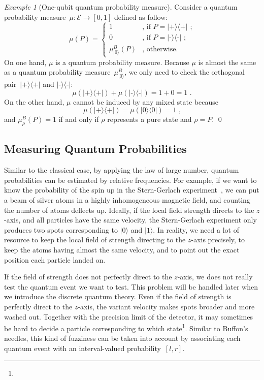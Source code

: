 \documentclass{article}
\theoremstyle{remark}
\newtheorem{example}{Example}
\newcommand{\events}{\ensuremath{\mathcal{E}}}
\newcommand{\ket}[1]{|#1\rangle}
\newcommand{\proj}[1]{|#1 \rangle\langle #1 |}
\newcommand{\ps}{\texttt{+}}
\newcommand{\ms}{\texttt{-}}
\newcommand{\yutsung}[1]{\fbox{\begin{minipage}{0.9\textwidth}\color{purple}{Yu-Tsung says: #1}\end{minipage}}}
\begin{document}
\begin{example}[One-qubit quantum probability measure] Consider
a quantum probability measure~$\mu:\events\rightarrow[0,1]$ defined
as follow: 
\[
\mu(P)=\begin{cases}
1 & \textrm{, if }P=\proj{\ps}\textrm{ ;}\\
0 & \textrm{, if }P=\proj{\ms}\textrm{ ;}\\
\mu_{\ket{0}}^{B}(P) & \textrm{, otherwise.}
\end{cases}
\]
On one hand, $\mu$ is a quantum probability measure. Because $\mu$
is almost the same as a quantum probability measure~$\mu_{\ket{0}}^{B}$,
we only need to check the orthogonal pair~$\proj{\ps}$ and $\proj{\ms}$:
\[
\mu(\proj{\ps})+\mu(\proj{\ms})=1+0=1\textrm{ .}
\]
On the other hand, $\mu$ cannot be induced by any mixed state because
\[
\mu(\proj{\ps})=\mu(\proj{0})=1\textrm{ ,}
\]
and $\mu_{\rho}^{B}(P)=1$ if and only if $\rho$ represents a pure
state and $\rho=P$. \qed\end{example}

\subsection{Measuring Quantum Probabilities}

Similar to the classical case, by applying the law of large number,
quantum probabilities can be estimated by relative frequencies. For
example, if we want to know the probability of the spin up in the
Stern-Gerlach experiment~\cite{Stern1988,peres1995quantum,544199,Griffiths2003},
we can put a beam of silver atoms in a highly inhomogeneous magnetic
field, and counting the number of atoms deflects up. Ideally, if the
local field strength directs to the $z$-axis, and all particles have
the same velocity, the Stern-Gerlach experiment only produces two
spots corresponding to $\ket{0}$ and $\ket{1}$. In reality, we need
a lot of resource to keep the local field of strength directing to
the $z$-axis precisely, to keep the atoms having almost the same velocity,
and to point out the exact position each particle landed on. 

If the field of strength does not perfectly direct to the $z$-axis,
we does not really test the quantum event we want to test. This problem
will be handled later when we introduce the discrete quantum theory.
Even if the field of strength is perfectly direct to the $z$-axis,
the variant velocity makes spots broader and more washed out. Together
with the precision limit of the detector, it may sometimes be hard
to decide a particle corresponding to which state\footnote{\yutsung{Add citations to support the idea... Haven't found suitable
ones...}}. Similar to Buffon's needles, this kind of fuzziness can be taken
into account by associating each quantum event with an interval-valued
probability~$\left[l,r\right]$. 
\end{document}
